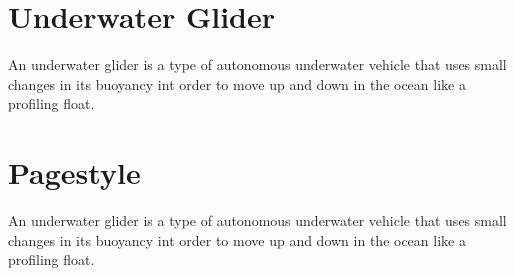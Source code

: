 \documentclass[12pt]{article}
\begin{document}
\section{Underwater Glider}
An underwater glider is a type of autonomous underwater vehicle that uses small changes in its buoyancy int order to move up and down in the ocean like a profiling float. 

\newpage
\section{Pagestyle}
An underwater glider is a type of autonomous underwater vehicle that uses small changes in its buoyancy int order to move up and down in the ocean like a profiling float. 
\end{document}
